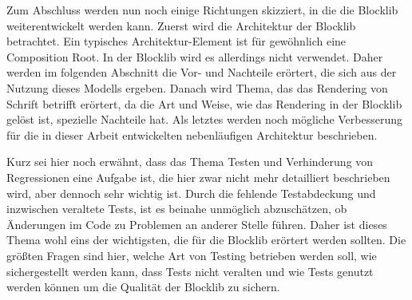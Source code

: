 Zum Abschluss werden nun noch einige Richtungen skizziert, in die die Blocklib weiterentwickelt werden kann. Zuerst wird die Architektur der Blocklib betrachtet. Ein typisches Architektur-Element ist für gewöhnlich eine Composition Root. In der Blocklib wird es allerdings nicht verwendet. Daher werden im folgenden Abschnitt die Vor- und Nachteile erörtert, die sich aus der Nutzung dieses Modells ergeben. Danach wird Thema, das das Rendering von Schrift betrifft erörtert, da die Art und Weise, wie das Rendering in der Blocklib gelöst ist, spezielle Nachteile hat. Als letztes werden noch mögliche Verbesserung für die in dieser Arbeit entwickelten nebenläufigen Architektur beschrieben.

Kurz sei hier noch erwähnt, dass das Thema Testen und Verhinderung von Regressionen eine Aufgabe ist, die hier zwar nicht mehr detailliert beschrieben wird, aber dennoch sehr wichtig ist. Durch die fehlende Testabdeckung und inzwischen veraltete Tests, ist es beinahe unmöglich abzuschätzen, ob Änderungen im Code zu Problemen an anderer Stelle führen. Daher ist dieses Thema wohl eins der wichtigsten, die für die Blocklib erörtert werden sollten. Die größten Fragen sind hier, welche Art von Testing betrieben werden soll, wie sichergestellt werden kann, dass Tests nicht veralten und wie Tests genutzt werden können um die Qualität der Blocklib zu sichern.